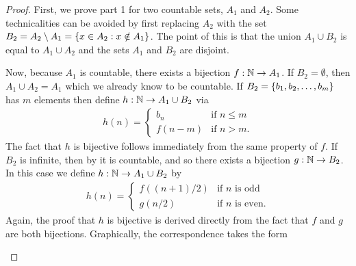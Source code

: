 \begin{proof}
  First, we prove part 1 for two countable sets, $A_1$ and $A_2$.
  Some technicalities can be avoided by first replacing $A_2$ with
  the set $B_2 = A_2 \setminus A_1 = \{ x \in A_2 : x \notin A_1 \}$.
  The point of this is that the union $A_1 \cup B_2$ is equal to $A_1
  \cup A_2$ and the sets $A_1$ and $B_2$ are disjoint.

  Now, because $A_1$ is countable, there exists a bijection $f : \mathbb N
  \to A_1$. If $B_2 = \emptyset$, then $A_1 \cup A_2 = A_1$ which we
  already know to be countable. If $B_2 = \{ b_1, b_2, \dots, b_m \}$
  has $m$ elements then define $h : \mathbb N \to A_1 \cup B_2$ via
  \begin{align*}
    h(n) =
    \begin{cases}
      b_n & \text{if $n \leq m$} \\
      f(n - m) & \text{if $n > m$}.
    \end{cases}
  \end{align*}
  The fact that $h$ is bijective follows immediately from the same
  property of $f$. If $B_2$ is infinite, then by
   it is countable, and so there
  exists a bijection $g : \mathbb N \to B_2$. In this case we define $h :
  \mathbb N \to A_1 \cup B_2$ by
  \begin{align*}
    h(n) =
    \begin{cases}
      f((n + 1) / 2) & \text{if $n$ is odd} \\
      g(n / 2) & \text{if $n$ is even}.
    \end{cases}
  \end{align*}
  Again, the proof that $h$ is bijective is derived directly from the
  fact that $f$ and $g$ are both bijections. Graphically, the
  correspondence takes the form

  \begin{tightfigure}
    \centering
  \end{tightfigure}


\end{proof}
